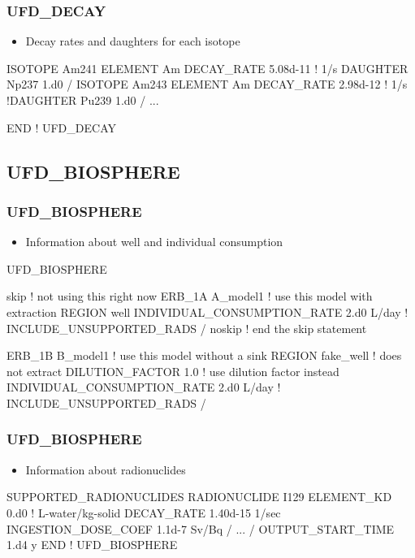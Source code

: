 \documentclass{beamer}
\newcommand\bluecomment[1]{{{\color{blue} #1}}}
\begin{document}
\begin{frame}[fragile]\frametitle{UFD\_DECAY}

\begin{itemize}
  \item Decay rates and daughters for each isotope
\end{itemize}

\begin{semiverbatim}\small
  ISOTOPE Am241
    ELEMENT Am
    DECAY_RATE 5.08d-11 \bluecomment{! 1/s}
    DAUGHTER Np237 1.d0
  /
  ISOTOPE Am243
    ELEMENT Am
    DECAY_RATE 2.98d-12 \bluecomment{! 1/s}
    \bluecomment{!DAUGHTER Pu239 1.d0}
  /
\bluecomment{...}

END \bluecomment{! UFD_DECAY}
\end{semiverbatim}
\end{frame}

\subsection{UFD\_BIOSPHERE}
\begin{frame}[fragile]\frametitle{UFD\_BIOSPHERE}

\begin{itemize}
  \item Information about well and individual consumption
\end{itemize}

\begin{semiverbatim}\small
UFD_BIOSPHERE

skip \bluecomment{! not using this right now}
  ERB_1A A_model1 \bluecomment{! use this model with extraction}
    REGION well
    INDIVIDUAL_CONSUMPTION_RATE 2.d0 L/day
    \bluecomment{! INCLUDE_UNSUPPORTED_RADS}
  /
noskip \bluecomment{! end the skip statement}

  ERB_1B B_model1 \bluecomment{! use this model without a sink}
    REGION fake_well \bluecomment{! does not extract}
    DILUTION_FACTOR 1.0 \bluecomment{! use dilution factor instead}
    INDIVIDUAL_CONSUMPTION_RATE 2.d0 L/day
    \bluecomment{! INCLUDE_UNSUPPORTED_RADS}
  /

\end{semiverbatim}
\end{frame}

\begin{frame}[fragile]\frametitle{UFD\_BIOSPHERE}

\begin{itemize}
  \item Information about radionuclides
\end{itemize}

\begin{semiverbatim}\small
  SUPPORTED_RADIONUCLIDES
    RADIONUCLIDE I129
      ELEMENT_KD 0.d0  \bluecomment{! L-water/kg-solid}
      DECAY_RATE 1.40d-15 1/sec
      INGESTION_DOSE_COEF 1.1d-7 Sv/Bq
    /
    \bluecomment{...}
  /
  OUTPUT_START_TIME 1.d4 y
END \bluecomment{! UFD_BIOSPHERE}
\end{semiverbatim}
\end{frame}
\end{document}
